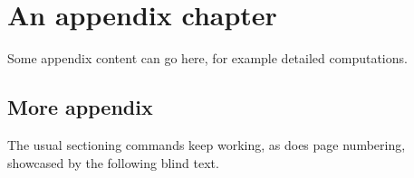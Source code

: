 
\chapter{An appendix chapter}

Some appendix content can go here, for example detailed computations.

\section{More appendix}

The usual sectioning commands keep working, as does page numbering, showcased by the
following blind text.

\Blindtext